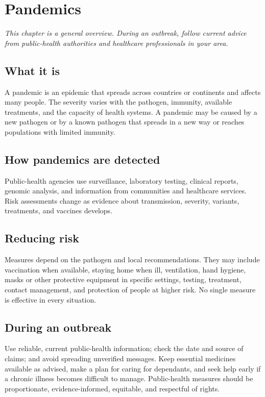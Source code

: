 \chapter{Pandemics}

\medskip
\noindent\textit{This chapter is a general overview. During an outbreak, follow current advice from public-health authorities and healthcare professionals in your area.}

\section*{What it is}
A pandemic is an epidemic that spreads across countries or continents and affects many people. The severity varies with the pathogen, immunity, available treatments, and the capacity of health systems. A pandemic may be caused by a new pathogen or by a known pathogen that spreads in a new way or reaches populations with limited immunity.

\section*{How pandemics are detected}
Public-health agencies use surveillance, laboratory testing, clinical reports, genomic analysis, and information from communities and healthcare services. Risk assessments change as evidence about transmission, severity, variants, treatments, and vaccines develops.

\section*{Reducing risk}
Measures depend on the pathogen and local recommendations. They may include vaccination when available, staying home when ill, ventilation, hand hygiene, masks or other protective equipment in specific settings, testing, treatment, contact management, and protection of people at higher risk. No single measure is effective in every situation.

\section*{During an outbreak}
Use reliable, current public-health information; check the date and source of claims; and avoid spreading unverified messages. Keep essential medicines available as advised, make a plan for caring for dependants, and seek help early if a chronic illness becomes difficult to manage. Public-health measures should be proportionate, evidence-informed, equitable, and respectful of rights.

